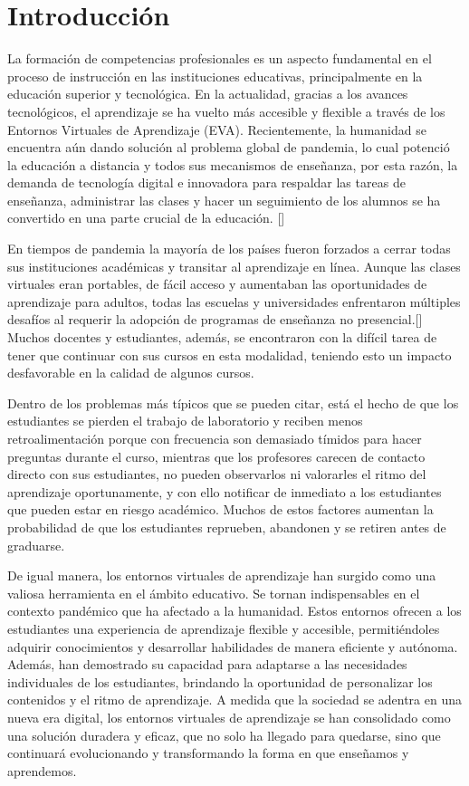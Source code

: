 \chapter*{Introducción}\label{chapter:introduction}
La formación de competencias profesionales es un aspecto fundamental en el proceso de instrucción en las 
instituciones educativas, principalmente en la educación superior y tecnológica. En la actualidad, 
gracias a los avances tecnológicos, el aprendizaje se ha vuelto más accesible y flexible a través de 
los Entornos Virtuales de Aprendizaje (EVA). Recientemente, la humanidad se encuentra aún dando 
solución al problema global de pandemia, lo cual potenció la educación a distancia y todos sus mecanismos 
de enseñanza, por esta razón, la demanda de tecnología digital e innovadora para respaldar las tareas de 
enseñanza, administrar las clases y hacer un seguimiento de los alumnos se ha convertido en una parte 
crucial de la educación. [\cite{CrucialEdu}] 

En tiempos de pandemia la mayoría de los países fueron forzados a cerrar todas sus instituciones académicas 
y transitar al aprendizaje en línea. Aunque las clases virtuales eran portables, de fácil acceso 
y aumentaban las oportunidades de aprendizaje para adultos, todas las escuelas y universidades enfrentaron 
múltiples desafíos al requerir la adopción de programas de enseñanza no presencial.[\cite{Conferencia,Journal}] Muchos 
docentes y estudiantes, además, se encontraron con la difícil tarea de tener que continuar con sus cursos 
en esta modalidad, teniendo esto un impacto desfavorable en la calidad de algunos cursos. 

Dentro de los problemas más típicos que 
se pueden citar, está el hecho de que los estudiantes se pierden el trabajo de laboratorio y reciben 
menos retroalimentación porque con frecuencia son demasiado tímidos para hacer preguntas durante el curso, 
mientras que los profesores carecen de contacto directo con sus estudiantes, no pueden 
observarlos ni valorarles el ritmo del aprendizaje oportunamente, y con ello notificar de inmediato a los estudiantes que pueden 
estar en riesgo académico. Muchos de estos factores aumentan la probabilidad de que los estudiantes reprueben, 
abandonen y se retiren antes de graduarse. 

De igual manera, los entornos virtuales de aprendizaje han surgido como una valiosa 
herramienta en el ámbito educativo. Se tornan indispensables en el contexto pandémico
que ha afectado a la humanidad. Estos entornos ofrecen a los estudiantes una 
experiencia de aprendizaje flexible y accesible, permitiéndoles adquirir 
conocimientos y desarrollar habilidades de manera eficiente y autónoma. Además, 
han demostrado su capacidad para adaptarse a las necesidades individuales de los 
estudiantes, brindando la oportunidad de personalizar los contenidos y el ritmo 
de aprendizaje. A medida que la sociedad se adentra en una nueva era digital, 
los entornos virtuales de aprendizaje se han consolidado como una solución 
duradera y eficaz, que no solo ha llegado para quedarse, sino que continuará 
evolucionando y transformando la forma en que enseñamos y aprendemos.

